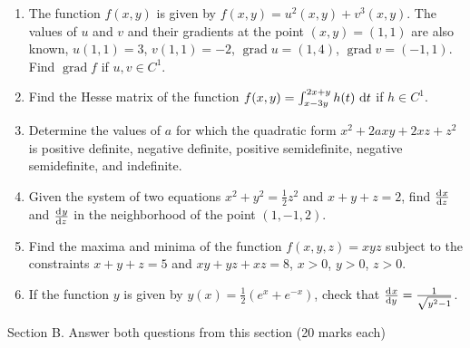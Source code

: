 \documentclass[12pt]{article} %
\theoremstyle{definition} %
\DeclareMathOperator{\grad}{grad}
\providecommand{\grad}{\mathrm{grad}\,}
\begin{document}
\begin{enumerate}

\item The function $f(x,y)$ is given by $f(x,y)=u^2(x,y)+v^3(x,y)$. The values of $u$ and $v$ and their gradients at the point $(x,y)=(1,1)$ are also known, $u(1,1)=3$, $v(1,1)=-2$, $\grad u=(1,4)$, $\grad v=(-1,1)$. Find $\grad f$ if $u,v \in C^1$.
\item Find the Hesse matrix of the function $f(x,y)=\int_{x-3y}^{2x+y}h(t)\,\dif t$ if $h\in C^1$.

\item Determine the values of $a$ for which the quadratic form $x^2 + 2axy + 2xz + z^2$ is positive definite, negative definite, positive semidefinite, negative semidefinite, and indefinite.

\item Given the system of two equations $x^2+y^2=\frac{1}{2}z^2$ and $x+y+z=2$, find $\od{x}{z}$ and $\od{y}{z}$ in the neighborhood of the point $(1,-1,2)$.

\item Find the maxima and minima of the function $f(x,y,z)=xyz$ subject to the constraints $x+y+z=5$ and $xy+yz+xz=8$, $x>0$, $y>0$, $z>0$.

\item If the function $y$ is given by $y(x)=\frac{1}{2}(e^x+e^{-x})$, check that $\od{x}{y}=\frac{1}{\sqrt{y^2-1}} $.
\end{enumerate}

Section B. Answer both questions from this section (20 marks each) \\
\end{document}
